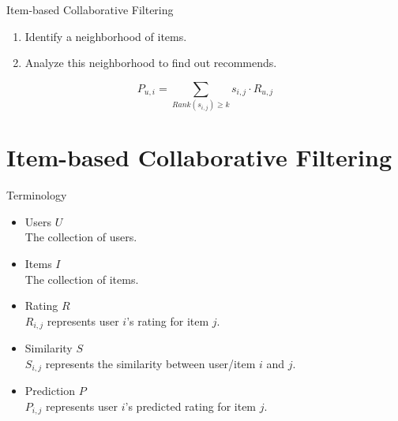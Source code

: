 \documentclass{beamer}
\begin{document}
\begin{frame}[fragile]{Item-based Collaborative Filtering}

\begin{enumerate}
\item Identify a neighborhood of items.
\item Analyze this neighborhood to find out recommends.
\end{enumerate}

\begin{equation}
P_{u,i} = \sum_{Rank(s_{i,j})\geq k}s_{i,j} \cdot R_{u,j}
\end{equation}

\end{frame}

\section{Item-based Collaborative Filtering}

\begin{frame}{Terminology}

\begin{itemize}
\item Users $U$\\
        The collection of users.
\item Items $I$\\
        The collection of items.
\item Rating $R$\\
        $R_{i,j}$ represents user $i$'s rating for item $j$.
\item Similarity $S$\\
        $S_{i,j}$ represents the similarity between user/item $i$ and $j$.
\item Prediction $P$ \\
        $P_{i,j}$ represents user $i$'s predicted rating for item $j$.
\end{itemize}

\end{frame}
\end{document}
